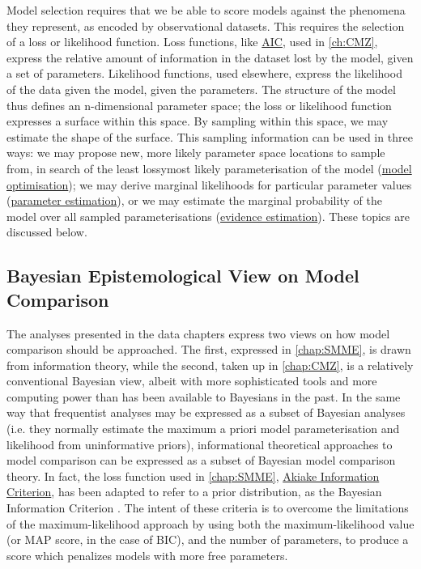 Model selection requires that we be able to score models against the phenomena they represent, as encoded by observational datasets. This requires the selection of a loss or likelihood function. Loss functions, like \hyperref[AIC]{AIC}, used in \autoref{ch:CMZ}, express the relative amount of information in the dataset lost by the model, given a set of parameters. Likelihood functions, used elsewhere, express the likelihood of the data given the model, given the parameters. The structure of the model thus defines an n-dimensional parameter space; the loss or likelihood function expresses a surface within this space. By sampling within this space, we may estimate the shape of the surface. This sampling information can be used in three ways: we may propose new, more likely parameter space locations to sample from, in search of the least lossy\/most likely parameterisation of the model (\hyperref[opt]{model optimisation}); we may derive marginal likelihoods for particular parameter values (\hyperref[est]{parameter estimation}), or we may estimate the marginal probability of the model over all sampled parameterisations (\hyperref[evi]{evidence estimation}). These topics are discussed below.

\subsection{Bayesian Epistemological View on Model Comparison}
The analyses presented in the data chapters express two views on how model comparison should be approached. The first, expressed in \autoref{chap:SMME}, is drawn from information theory, while the second, taken up in \autoref{chap:CMZ}, is a relatively conventional Bayesian view, albeit with more sophisticated tools and more computing power than has been available to Bayesians in the past. In the same way that frequentist analyses may be expressed as a subset of Bayesian analyses (i.e. they normally estimate the maximum a priori model parameterisation and likelihood from uninformative priors), informational theoretical approaches to model comparison can be expressed as a subset of Bayesian model comparison theory. In fact, the loss function used in \autoref{chap:SMME}, \hyperref[AIC]{Akiake Information Criterion}, has been adapted to refer to a prior distribution, as the Bayesian Information Criterion \cite{Posada2004}. The intent of these criteria is to overcome the limitations of the maximum-likelihood approach by using both the maximum-likelihood value (or MAP score, in the case of BIC), and the number of parameters, to produce a score which penalizes models with more free parameters.

